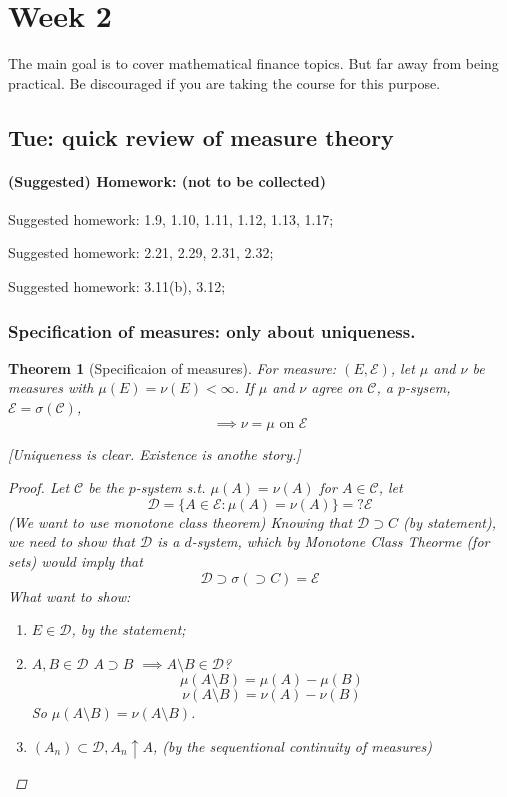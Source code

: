 \documentclass[11pt]{article}
\newcommand{\m}{\mathcal}
\newtheorem{theorem}{Theorem}[subsection]
\begin{document}
        \section{Week 2}
        The main goal is to cover mathematical finance topics. But far away from being
        practical. Be discouraged if you are taking the course for this purpose. 
        \subsection{Tue: quick review of measure theory}
        \paragraph{(Suggested) Homework: (not to be collected)}
        Suggested homework: 1.9, 1.10, 1.11, 1.12, 1.13, 1.17; 

        Suggested homework: 2.21, 2.29, 2.31, 2.32; 

        Suggested homework: 3.11(b), 3.12; 

        \subsubsection{Specification of measures: only about uniqueness. }

        \begin{theorem}[Specificaion of measures]

          For measure: $(E, \m E)$, let $\mu$ and $\nu$ be measures with $\mu(E) = \nu (E)
          < \infty$. If $\mu$ and $\nu$ agree on $\m C$, a $p$-sysem, $\m E = \sigma ( \m
          C)$, 
          \[
            \implies \nu = \mu \text{ on } \m E
          \]


          [Uniqueness is clear. Existence is anothe story.]
          \label{thm:specification-of-measures}
          \begin{proof}
            Let $\m C$ be the $p$-system s.t. $\mu(A) = \nu (A )$ for $A \in \m C$, let 
            \[
              \m D = \{ A \in \m E: \mu(A) = \nu (A) \}  =? \m E
            \]
            (We want to use monotone class theorem) Knowing that $\m D \supset C$ (by
            statement), we need to show that $\m D$ is a $d$-system, which by Monotone
            Class Theorme (for sets) would imply that 
            \[
              \m D \supset \sigma( \supset C) = \m E
            \]
            What want to show: 
            \begin{enumerate}
              \item $E \in \m D$,  by the statement; 
              \item $A, B \in \m D$ $A \supset B$ $\implies A \setminus B \in \m D$? 
                \[
                \mu(A\setminus B) = \mu(A) - \mu(B)\]
                \[
                \nu(A\setminus B) = \nu(A) - \nu(B)\]
                So $\mu(A\setminus B ) = \nu(A\setminus B)$. 

              \item $(A_n) \subset \m D, A_n \uparrow A$, (by the sequentional continuity of measures) 
            \end{enumerate}
          \end{proof}
        \end{theorem}
\end{document}
